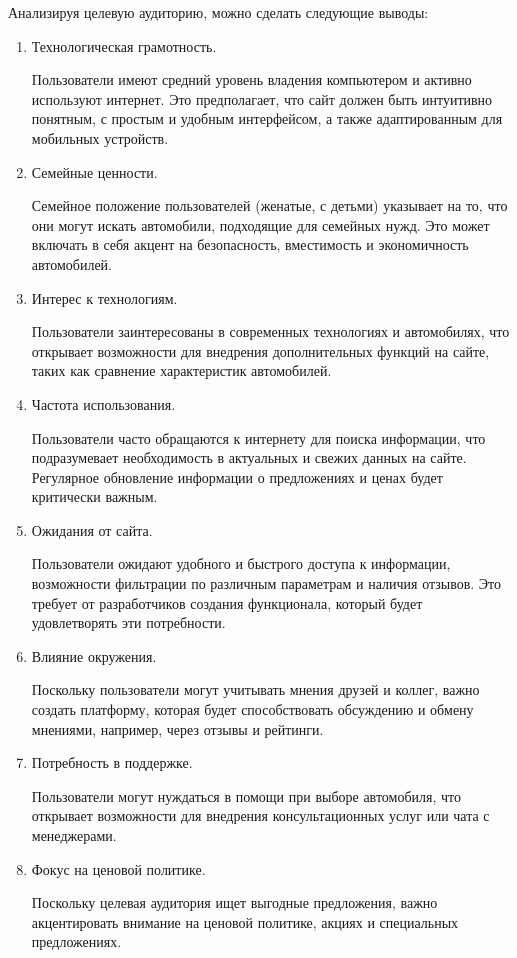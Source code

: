 Анализируя целевую аудиторию, можно сделать следующие выводы:
\begin{enumerate}
    \item Технологическая грамотность.

    Пользователи имеют средний уровень владения компьютером и активно используют интернет. Это предполагает, что сайт должен быть интуитивно понятным, с простым и удобным интерфейсом, а также адаптированным для мобильных устройств.

    \item Семейные ценности.

    Семейное положение пользователей (женатые, с детьми) указывает на то, что они могут искать автомобили, подходящие для семейных нужд. Это может включать в себя акцент на безопасность, вместимость и экономичность автомобилей.

    \item Интерес к технологиям.

    Пользователи заинтересованы в современных технологиях и автомобилях, что открывает возможности для внедрения дополнительных функций на сайте, таких как сравнение характеристик автомобилей.

    \item Частота использования.

    Пользователи часто обращаются к интернету для поиска информации, что подразумевает необходимость в актуальных и свежих данных на сайте. Регулярное обновление информации о предложениях и ценах будет критически важным.

    \item Ожидания от сайта.

    Пользователи ожидают удобного и быстрого доступа к информации, возможности фильтрации по различным параметрам и наличия отзывов. Это требует от разработчиков создания функционала, который будет удовлетворять эти потребности.

    \item Влияние окружения.

    Поскольку пользователи могут учитывать мнения друзей и коллег, важно создать платформу, которая будет способствовать обсуждению и обмену мнениями, например, через отзывы и рейтинги.

    \item Потребность в поддержке.

    Пользователи могут нуждаться в помощи при выборе автомобиля, что открывает возможности для внедрения консультационных услуг или чата с менеджерами.

    \item Фокус на ценовой политике.

    Поскольку целевая аудитория ищет выгодные предложения, важно акцентировать внимание на ценовой политике, акциях и специальных предложениях.
\end{enumerate}
\bigskip

